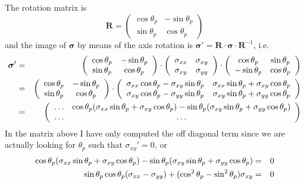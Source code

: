 The rotation matrix is 
\[
{\bm R}=
\left(
\begin{array}{cc}
\cos\theta_p & -\sin\theta_p \\
\sin\theta_p & \cos\theta_p
\end{array}
\right)
\]
and the image of ${\bm \sigma}$ by means of the axis rotation is 
${\bm \sigma}'= {\bm R}\cdot {\bm \sigma}\cdot {\bm R}^{-1}$, i.e.
\begin{eqnarray}
{\bm \sigma}' 
&=&
\left(
\begin{array}{cc}
\cos\theta_p & -\sin\theta_p \\
\sin\theta_p & \cos\theta_p
\end{array}
\right)
\cdot
\left(
\begin{array}{cc}
\sigma_{xx} & \sigma_{xy} \\
\sigma_{xy} & \sigma_{yy} 
\end{array}
\right)
\cdot
\left(
\begin{array}{cc}
\cos\theta_p & \sin\theta_p \\
-\sin\theta_p & \cos\theta_p
\end{array}
\right) \nonumber\\
&=&\left(
\begin{array}{cc}
\cos\theta_p & -\sin\theta_p \\
\sin\theta_p & \cos\theta_p
\end{array}
\right)
\cdot
\left(
\begin{array}{cc}
\sigma_{xx} \cos\theta_p - \sigma_{xy} \sin\theta_p  &
\sigma_{xx} \sin\theta_p + \sigma_{xy} \cos\theta_p  \\
\sigma_{xy} \cos\theta_p - \sigma_{yy} \sin\theta_p & 
\sigma_{xy} \sin\theta_p + \sigma_{yy} \cos\theta_p 
\end{array}
\right) \nonumber\\
&=&
\left(
\begin{array}{cc}
\dots & 
\cos\theta_p(\sigma_{xx} \sin\theta_p + \sigma_{xy} \cos\theta_p )-
\sin\theta_p(\sigma_{xy} \sin\theta_p + \sigma_{yy} \cos\theta_p ) \\
\dots & \dots 
\end{array}
\right) \nonumber 
\end{eqnarray}
In the matrix above I have only computed the off diagonal term since 
we are actually looking for $\theta_p$ such that $\sigma_{xy}'=0$, or
\begin{eqnarray}
\cos\theta_p(\sigma_{xx} \sin\theta_p + \sigma_{xy} \cos\theta_p )-
\sin\theta_p(\sigma_{xy} \sin\theta_p + \sigma_{yy} \cos\theta_p ) &=& 0 \nonumber\\
\sin\theta_p \cos\theta_p (\sigma_{xx}-\sigma_{yy}) + ( \cos^2\theta_p -\sin^2\theta_p )\sigma_{xy} &=& 0 \nonumber 
\end{eqnarray}
